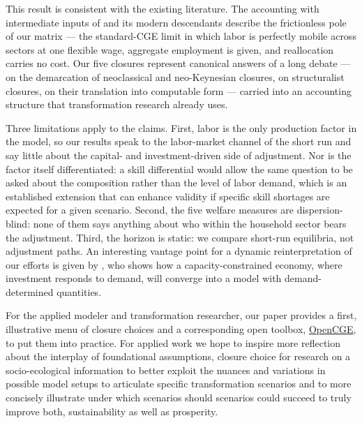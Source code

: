 This result is consistent with the existing literature. The accounting with intermediate inputs of \citet{Hulten.1978} and its modern descendants \citep{Baqaee.2021,Acemoglu.2012} describe the frictionless pole of our matrix --- the standard-CGE limit in which labor is perfectly mobile across sectors at one flexible wage, aggregate employment is given, and reallocation carries no cost. Our five closures represent  canonical answers of a long debate --- \citet{Sen1963} on the demarcation of neoclassical and neo-Keynesian closures, \citet{Taylor1990} on structuralist closures, \citet{Rose.1995} on their translation into computable form ---
carried into an accounting structure that transformation research already
uses.

Three limitations apply to the claims. First, labor is the only production factor in the model, so our results speak to the labor-market channel of the short run and say little about the capital- and investment-driven side of adjustment. Nor is the factor itself differentiated: a skill differential would allow the same question to be asked about the composition rather than the level of labor demand, which is an established extension that can enhance validity if specific skill shortages are expected for a given scenario. Second, the five welfare measures are dispersion-blind: none of them says anything about who within the household sector bears the adjustment. Third, the horizon is static: we compare short-run equilibria, not adjustment paths. An interesting vantage point for a dynamic reinterpretation of our efforts is given by \citet{McGregor.1996}, who shows how a capacity-constrained economy, where investment responds to demand, will converge into a model with demand-determined quantities.

For the applied modeler and transformation researcher, our paper provides a first, illustrative menu of closure choices and a corresponding open toolbox, \href{https://github.com/theplatters/OpenCGE}{OpenCGE}, to put them into practice. For applied work we hope to inspire more reflection about the interplay of foundational assumptions, closure choice for research on a socio-ecological information to better exploit the nuances and variations in possible model setups to articulate specific transformation scenarios and to more concisely illustrate under which scenarios should scenarios could succeed to truly improve both, sustainability as well as prosperity.
